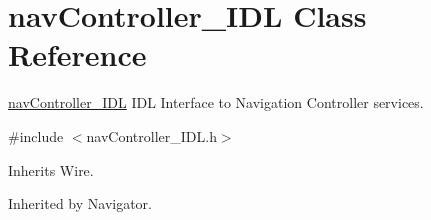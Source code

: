 \section{nav\+Controller\+\_\+\+I\+DL Class Reference}
\label{classnavController__IDL}


\hyperlink{classnavController__IDL}{nav\+Controller\+\_\+\+I\+DL} I\+DL Interface to Navigation Controller services.  




{\ttfamily \#include $<$nav\+Controller\+\_\+\+I\+D\+L.\+h$>$}



Inherits Wire.



Inherited by Navigator.

